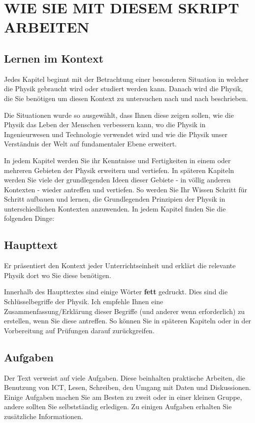 \documentclass[11pt]{scrbook}
\begin{document}
\newpage
\thispagestyle{empty}
\mbox{}

\chapter*{WIE SIE MIT DIESEM SKRIPT ARBEITEN}
\section{Lernen im Kontext}
Jedes Kapitel beginnt mit der Betrachtung einer besonderen Situation in welcher die Physik gebraucht wird oder studiert werden kann. Danach wird die Physik, die Sie benötigen um diesen Kontext zu untersuchen nach und nach beschrieben. \newline

Die Situationen wurde so ausgewählt, dass Ihnen diese zeigen sollen, wie die Physik das Leben der Menschen verbessern kann, wo die Physik in Ingenieurwesen und Technologie verwendet wird und wie die Physik unser Verständnis der Welt auf fundamentaler Ebene erweitert.

In jedem Kapitel werden Sie ihr Kenntnisse und Fertigkeiten in einem oder mehreren Gebieten der Physik erweitern und vertiefen. In späteren Kapiteln werden Sie viele der grundlegenden Ideen dieser Gebiete - in völlig anderen Kontexten - wieder antreffen und vertiefen. So werden Sie Ihr Wissen Schritt für Schritt aufbauen und lernen, die Grundlegenden Prinzipien der Physik in unterschiedlichen Kontexten anzuwenden. In jedem Kapitel finden Sie die folgenden Dinge:

\section{Haupttext}
Er präsentiert den Kontext jeder Unterrichtseinheit und erklärt die relevante Physik dort wo Sie diese benötigen. \newline

Innerhalb des Haupttextes sind einige Wörter \textbf{fett} gedruckt. Dies sind die Schlüssel\-begriffe der Physik. Ich empfehle Ihnen eine Zusammenfassung/Erklärung dieser Begriffe (und anderer wenn erforderlich) zu erstellen, wenn Sie diese antreffen. So können Sie in späteren Kapiteln oder in der Vorbereitung auf Prüfungen darauf zurückgreifen. 

\section{Aufgaben}
Der Text verweist auf viele Aufgaben. Diese beinhalten praktische Arbeiten, die Benutzung von ICT, Lesen, Schreiben, den Umgang mit Daten und Diskussionen. Einige Aufgaben machen Sie am Besten zu zweit oder in einer kleinen Gruppe, andere sollten Sie selbstständig erledigen. Zu einigen Aufgaben erhalten Sie zusätzliche Informationen.
\end{document}
